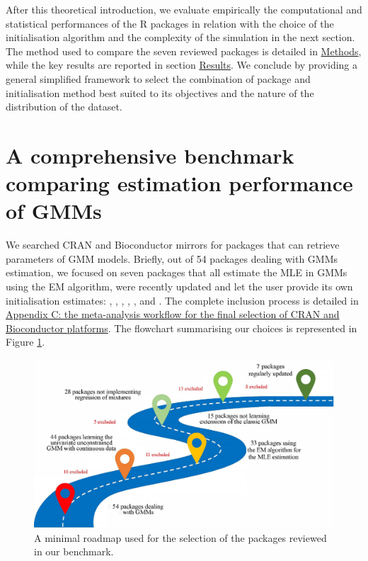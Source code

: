 After this theoretical introduction, we evaluate empirically the
computational and statistical performances of the R packages in relation
with the choice of the initialisation algorithm and the complexity of
the simulation in the next section. The method used to compare the seven reviewed
packages is detailed in \protect\hyperlink{methods}{Methods}, while the key results are reported in
section \protect\hyperlink{results}{Results}. We conclude by providing a general simplified
framework to select the combination of package and initialisation method best suited to its objectives and the nature of the distribution of the dataset.

\hypertarget{a-comprehensive-benchmark-comparing-estimation-performance-of-gmms}{%
\section{A comprehensive benchmark comparing estimation performance of GMMs}\label{a-comprehensive-benchmark-comparing-estimation-performance-of-gmms}}

We searched CRAN and Bioconductor mirrors for packages that can retrieve
parameters of GMM models. Briefly, out of 54 packages dealing with GMMs
estimation, we focused on seven packages that all estimate the
MLE in GMMs using the EM algorithm, were recently
updated and let the user provide its own initialisation estimates:
, , ,
, ,  and . The
complete inclusion process is detailed in \protect\hyperlink{appendix-c-the-meta-analysis-workflow-for-the-final-selection-of-cran-and-bioconductor-platforms}{Appendix C: the meta-analysis workflow for the final selection of CRAN and Bioconductor platforms}. The flowchart summarising our choices is represented in Figure \ref{fig:flowchart}.

\begin{figure}

{\centering \includegraphics[width=1\linewidth]{figs/flowchart_packages_selection} 

}

\caption{A minimal roadmap used for the selection of the packages reviewed in our benchmark.}\label{fig:flowchart}
\end{figure}

